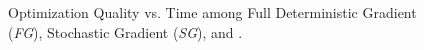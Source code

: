 \begin{figure}
\centerline{}
\caption[Optimization Quality among gradient methods]{Optimization Quality vs. Time among Full Deterministic Gradient (\emph{FG}), Stochastic Gradient (\emph{SG}), and \tool.}
\label{table:approx}
\end{figure}


